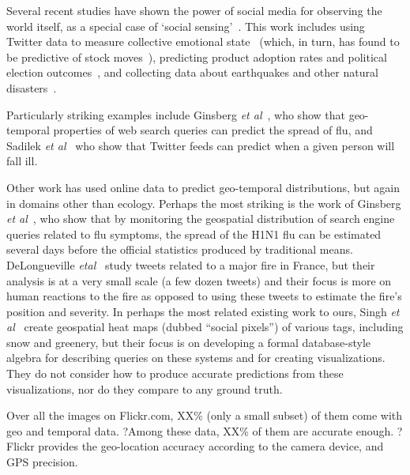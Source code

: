 \documentclass[10pt,journal,compsoc]{IEEEtran}
\begin{document}
Several recent studies have shown the power of social media  for observing
the world itself, as a special case of `social sensing'~\cite{Aggarwal:2013vh}.
This work includes using Twitter data to measure collective emotional
state~\cite{Golder:2011cy} (which, in turn, has found to
be predictive of stock  moves~\cite{bollen11twitter}),
predicting product adoption rates and political election
outcomes~\cite{jin10prediction}, and collecting data about
earthquakes and other natural disasters~\cite{Sakaki:2010uv}.

Particularly striking examples include Ginsberg
\textit{et al}~\cite{ginsberg09flu}, who show that 
geo-temporal properties of web search queries can
predict the spread of flu, and Sadilek \textit{et al}~\cite{Sadilek:2012wp} who show that
Twitter feeds can predict when a given person will
fall ill.


Other work has used online data to predict geo-temporal distributions,
but again in domains other than ecology.  Perhaps the most
striking is the work of Ginsberg \textit{et al}~\cite{ginsberg09flu},
who show that by monitoring the geospatial distribution of search
engine queries related to flu symptoms, the spread of the H1N1
flu can be estimated several days before the official statistics produced by traditional
means.
DeLongueville \textit{etal}~\cite{delongueville09} study tweets related to a major fire in
France, but their analysis is at a very small scale (a few dozen
tweets) and their focus is more on human reactions to the fire as
opposed to using these tweets to estimate the fire's position and
severity.  In perhaps the most related existing work to ours,
 Singh \textit{et al}~\cite{singh10socialpixels} create
geospatial heat maps (dubbed ``social pixels'') of various
tags, including snow and greenery, but their focus is on developing a
formal database-style algebra for describing queries on these systems
and for creating visualizations. They do not consider how to produce
accurate predictions from these visualizations, nor do they compare to
any ground truth.

Over all the images on Flickr.com, XX\% (only a small subset) of them come with geo and temporal data.
?Among these data, XX\% of them are accurate enough.
?Flickr provides the geo-location accuracy according to the camera device, and GPS precision.
\end{document}
